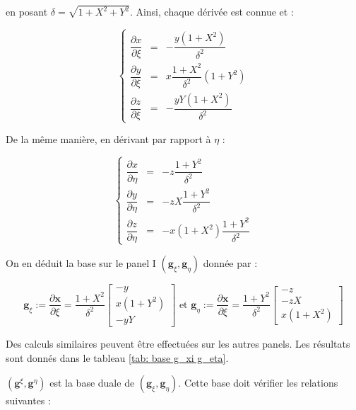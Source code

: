 en posant $\delta = \sqrt{1+X^2+Y^2}$. Ainsi, chaque dérivée est connue et :

\begin{equation}
\left\lbrace
\begin{array}{rcl}
\dfrac{\partial x}{\partial \xi} & = & -\dfrac{y(1+X^2)}{\delta^2}\\
\dfrac{\partial y}{\partial \xi} & = & x \dfrac{1+X^2}{\delta^2} (1+Y^2)\\
\dfrac{\partial z}{\partial \xi} & = & - \dfrac{yY(1+X^2)}{\delta^2}
\end{array}
\right.
\end{equation}

De la même manière, en dérivant par rapport à $\eta$ :

\begin{equation}
\left\lbrace
\begin{array}{rcl}
\dfrac{\partial x}{\partial \eta} & = & - z\dfrac{1+Y^2}{\delta^2}\\
\dfrac{\partial y}{\partial \eta} & = & - zX\dfrac{1+Y^2}{\delta^2}\\
\dfrac{\partial z}{\partial \eta} & = & - x(1+X^2) \dfrac{1+Y^2}{\delta^2}
\end{array}
\right.
\end{equation}

On en déduit la base sur le panel I $\left( \mathbf{g}_{\xi}, \mathbf{g}_{\eta} \right)$ donnée par :

\begin{equation}
\mathbf{g}_{\xi} := \dfrac{\partial \mathbf{x}}{\partial \xi}= \dfrac{1+X^2}{\delta^2} \begin{bmatrix}
-y \\ x(1+Y^2) \\ -yY
\end{bmatrix} \text{ et } \mathbf{g}_{\eta} := \dfrac{\partial \mathbf{x}}{\partial \xi}= \dfrac{1+Y^2}{\delta^2} \begin{bmatrix}
-z \\ -zX \\ x(1+X^2)
\end{bmatrix}
\label{eq: base locale I}
\end{equation}

Des calculs similaires peuvent être effectuées sur les autres panels. Les résultats sont donnés dans le tableau \ref{tab: base g_xi g_eta}.

$(\mathbf{g}^{\xi}, \mathbf{g}^{\eta})$ est la base duale de $(\mathbf{g}_{\xi}, \mathbf{g}_{\eta})$. Cette base doit vérifier les relations suivantes :

